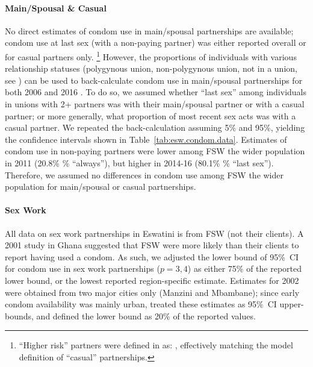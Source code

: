 \paragraph{Main/Spousal \& Casual}
No direct estimates of condom use in main/spousal partnerships are available;
condom use at last sex (with a non-paying partner)
was either reported overall or for casual partners only.%
\footnote{``Higher risk'' partners were defined in \cite{SDHS2006} as:
  ,
  effectively matching the model definition of ``casual'' partnerships.}
However, the proportions of individuals with various relationship statuses
(\eg polygynous union, non-polygynous union, not in a union, see )
can be used to back-calculate condom use in main/spousal partnerships
for both 2006 \cite{SDHS2006} and 2016 \cite{SHIMS2}.
To do so, we assumed whether ``last sex'' among individuals in unions with 2+ partners
was with their main/spousal partner or with a casual partner;
or more generally, what proportion of most recent sex acts was with a casual partner.
We repeated the back-calculation assuming 5\% and 95\%,
yielding the confidence intervals shown in Table~\ref{tab:esw.condom.data}.
Estimates of condom use in non-paying partners were
lower among FSW \vs the wider population in 2011 (20.8\% \vs {}\% ``always''), but
higher in 2014-16 (80.1\% \vs {}\% ``last sex'').
Therefore, we assumed no differences in condom use
among FSW \vs the wider population for main/spousal or casual partnerships.
\paragraph{Sex Work}
All data on sex work partnerships in Eswatini is from FSW (\ie not their clients).
A 2001 study in Ghana \cite{Cote2004} suggested that
FSW were more likely than their clients to report having used a condom.
As such, we adjusted the lower bound of 95\%~CI for condom use in sex work partnerships ($p=3,4$)
as either 75\% of the reported lower bound, or the lowest reported region-specific estimate.
Estimates for 2002 \cite{EswBSS2002} were obtained from two major cities only (Manzini and Mbambane);
since early condom availability was mainly urban,
treated these estimates as 95\%~CI upper-bounds,
and defined the lower bound as 20\% of the reported values.
